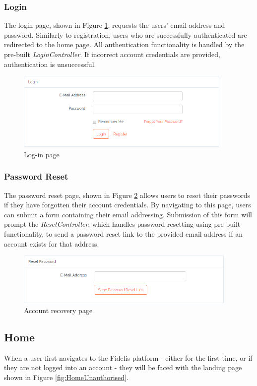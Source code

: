 \subsubsection{Login}
The login page, shown in Figure \ref{fig:LoginPage}, requests the users' email address and password. Similarly to registration, users who are successfully authenticated are redirected to the home page. All authentication functionality is handled by the pre-built \textit{LoginController}. If incorrect account credentials are provided, authentication is unsuccessful.

\begin{figure}[H]
\centering
\includegraphics[height=1.5in]{Images/Design/login-page}
\caption{Log-in page}
\label{fig:LoginPage}
\end{figure}

\subsubsection{Password Reset}
The password reset page, shown in Figure \ref{fig:PasswordReset} allows users to reset their passwords if they have forgotten their account credentials. By navigating to this page, users can submit a form containing their email addressing. Submission of this form will prompt the \textit{ResetController}, which handles password resetting using pre-built functionality, to send a password reset link to the provided email address if an account exists for that address.

\begin{figure}[H]
\centering
\includegraphics[height=1in]{Images/Implementation/PasswordReset}
\caption{Account recovery page}
\label{fig:PasswordReset}
\end{figure}

\subsection{Home}
When a user first navigates to the Fidelis platform - either for the first time, or if they are not logged into an account - they will be faced with the landing page shown in Figure \ref{fig:HomeUnauthorised}.  

